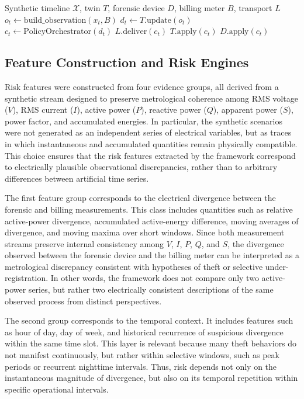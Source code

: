 \documentclass[journal]{IEEEtran}
\begin{document}
\begin{algorithm}[!ht]
\caption{Local closed loop of the digital twin}
\label{alg:closed_loop_twin}
\begin{algorithmic}[1]
\Require Synthetic timeline $\mathcal{X}$, twin $T$, forensic device $D$, billing meter $B$, transport $L$
        \State $o_t \gets \text{build\_observation}(x_t, B)$
        \State $d_t \gets T.\text{update}(o_t)$
        \State $c_t \gets \text{PolicyOrchestrator}(d_t)$
        \State $L.\text{deliver}(c_t)$
        \State $T.\text{apply}(c_t)$
        \State $D.\text{apply}(c_t)$
    \EndIf
\EndFor
\end{algorithmic}
\end{algorithm}


\subsection{Feature Construction and Risk Engines}
Risk features were constructed from four evidence groups, all derived from a synthetic stream designed to preserve metrological coherence among RMS voltage ($V$), RMS current ($I$), active power ($P$), reactive power ($Q$), apparent power ($S$), power factor, and accumulated energies. In particular, the synthetic scenarios were not generated as an independent series of electrical variables, but as traces in which instantaneous and accumulated quantities remain physically compatible. This choice ensures that the risk features extracted by the framework correspond to electrically plausible observational discrepancies, rather than to arbitrary differences between artificial time series.

The first feature group corresponds to the electrical divergence between the forensic and billing measurements. This class includes quantities such as relative active-power divergence, accumulated active-energy difference, moving averages of divergence, and moving maxima over short windows. Since both measurement streams preserve internal consistency among $V$, $I$, $P$, $Q$, and $S$, the divergence observed between the forensic device and the billing meter can be interpreted as a metrological discrepancy consistent with hypotheses of theft or selective under-registration. In other words, the framework does not compare only two active-power series, but rather two electrically consistent descriptions of the same observed process from distinct perspectives.

The second group corresponds to the temporal context. It includes features such as hour of day, day of week, and historical recurrence of suspicious divergence within the same time slot. This layer is relevant because many theft behaviors do not manifest continuously, but rather within selective windows, such as peak periods or recurrent nighttime intervals. Thus, risk depends not only on the instantaneous magnitude of divergence, but also on its temporal repetition within specific operational intervals.
\end{document}
